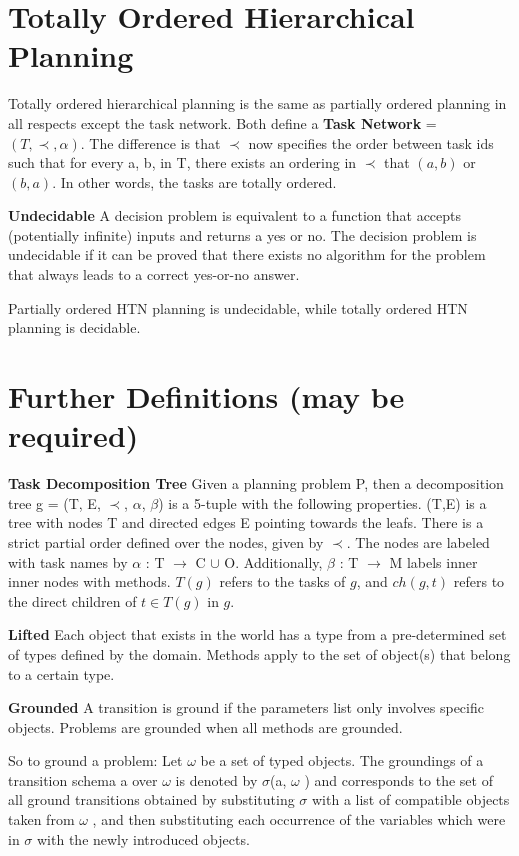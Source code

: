 \section{Totally Ordered Hierarchical Planning}
Totally ordered hierarchical planning is the same as partially ordered planning in all respects except the task network.
Both define a \textbf{Task Network} = $(T, \prec, \alpha)$.
The difference is that $\prec$ now specifies the order between task ids such that for every a, b, in T, there exists an ordering
in $\prec$ that $(a, b)$ or $(b, a)$.
In other words, the tasks are totally ordered. 


\textbf{Undecidable } A decision problem is equivalent to a function that accepts (potentially infinite) inputs and returns a yes or no. The decision problem is undecidable if it can be proved that there exists no algorithm for the problem that always leads to a correct yes-or-no answer.

Partially ordered HTN planning is undecidable, while totally ordered HTN planning is decidable.

\section{Further Definitions (may be required)}

\textbf{Task Decomposition Tree}
Given a planning problem P, then a decomposition tree g = (T, E, $\prec$, $\alpha$, $\beta$) is a 5-tuple with the following properties. (T,E) is a tree with nodes T and directed edges E pointing towards the leafs. There is a strict partial order defined over the nodes, given by $\prec$. The nodes are labeled with task names by $\alpha$ : T $\rightarrow$ C $\cup$ O.  Additionally, $\beta$ : T $\rightarrow$ M labels inner inner nodes with methods.
$T(g)$ refers to the tasks of $g$, and $ch(g,t)$ refers to the direct children of $t \in T(g)$ in $g$. 
 

\textbf{Lifted}
Each object that exists in the world has a type from a pre-determined set of types defined by the domain.
Methods apply to the set of object(s) that belong to a certain type.

\textbf{Grounded}
A transition is ground if the parameters list only involves specific objects. 
Problems are grounded when all methods are grounded.

So to ground a problem: Let $\omega$ be a set of typed objects. The groundings of
a transition schema a over $\omega$  is denoted by $\sigma$(a, $\omega$ ) and corresponds to the set of all ground transitions obtained by
substituting $\sigma$ with a list of compatible objects taken from $\omega$ , and then substituting each occurrence of the variables
which were in $\sigma$ with the newly introduced objects.  

